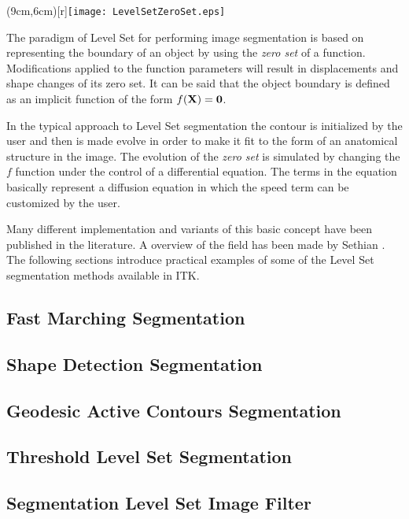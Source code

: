 %
%
% 
%
%
%



\parpic(9cm,6cm)[r]{\texttt{[image: LevelSetZeroSet.eps]}}

The paradigm of Level Set for performing image segmentation is based on
representing the boundary of an object by using the \emph{zero set} of a
function. Modifications applied to the function parameters will result in
displacements and shape changes of its zero set. It can be said that the object
boundary is defined as an implicit function of the form $f(\bf{X})=0$. 

In the typical approach to Level Set segmentation the contour is initialized by
the user and then is made evolve in order to make it fit to the form of an
anatomical structure in the image. The evolution of the \emph{zero set} is
simulated by changing the $f$ function under the control of a differential
equation.  The terms in the equation basically represent a diffusion equation
in which the speed term can be customized by the user.

Many different implementation and variants of this basic concept have been
published in the literature. A overview of the field has been made by Sethian
\cite{Sethian1996}. The following sections introduce practical examples of some
of the Level Set segmentation methods available in ITK.


\subsection{Fast Marching Segmentation}
\label{sec:FastMarchingImageFilter}

\ifitkFullVersion

\fi



\subsection{Shape Detection Segmentation}
\label{sec:ShapeDetectionLevelSetFilter}

\ifitkFullVersion

\fi


\subsection{Geodesic Active Contours Segmentation}
\label{sec:GeodesicActiveContourImageFilter}

\ifitkFullVersion

\fi



\subsection{Threshold Level Set Segmentation}

\subsection{Segmentation Level Set Image Filter}
\label{sec:SegmentationLevelSetImageFilter}


